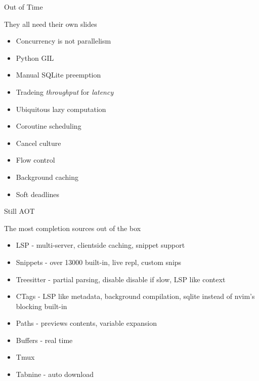 \documentclass{beamer}
\begin{document}
\begin{frame}{Out of Time}

	They all need their own slides

	\begin{itemize}

		\item Concurrency is not parallelism

		\item Python GIL

		\item Manual SQLite preemption

		\item Tradeing \textit{throughput} for \textit{latency}

		\item Ubiquitous lazy computation

		\item Coroutine scheduling

		\item Cancel culture

		\item Flow control

		\item Background caching

		\item Soft deadlines

	\end{itemize}

\end{frame}


\begin{frame}{Still AOT}

	The most completion sources out of the box

	\begin{itemize}

		\item LSP - multi-server, clientside caching, snippet support

		\item Snippets - over 13000 built-in, live repl, custom snips

		\item Treesitter - partial parsing, disable disable if slow, LSP like context

		\item CTags - LSP like metadata, background compilation, sqlite instead of nvim's blocking built-in

		\item Paths - previews contents, variable expansion

		\item Buffers - real time

		\item Tmux

		\item Tabnine - auto download

	\end{itemize}

\end{frame}
\end{document}
